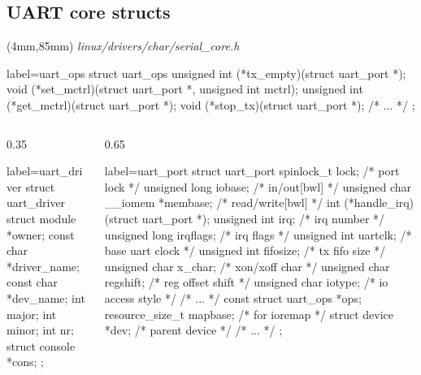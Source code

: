 \documentclass[xcolor=dvipsnames,compress]{beamer}
\newenvironment{reference}[2]{%
  \begin{textblock*}{\textwidth}(#1,#2) 
      \tiny\it\bgroup\color{blue}}{\egroup\end{textblock*}}
\begin{document}
\subsection*{UART core structs}
\begin{frame}[fragile]
\begin{reference}{4mm}{85mm}
linux/drivers/char/serial\_core.h
\end{reference} 
    \begin{ccode*}{label=uart\_ops} 
    struct uart_ops {
      unsigned int  (*tx_empty)(struct uart_port *);
      void          (*set_mctrl)(struct uart_port *, unsigned int mctrl);
      unsigned int  (*get_mctrl)(struct uart_port *);
      void          (*stop_tx)(struct uart_port *);
      /* ... */
    };   
    \end{ccode*}
    \begin{columns}[t]
    \begin{column}{0.35\textwidth}
    \begin{ccode*}{label=uart\_driver}
    struct uart_driver {
      struct module   *owner;
      const char      *driver_name;
      const char      *dev_name;
      int              major;
      int              minor;
      int              nr;
      struct console  *cons;
    };
    \end{ccode*}
    \end{column}
    \begin{column}{0.65\textwidth}
    \begin{ccode*}{label=uart\_port} 
    struct uart_port {
      spinlock_t             lock;      /* port lock */
      unsigned long          iobase;    /* in/out[bwl] */
      unsigned char __iomem  *membase;  /* read/write[bwl] */
      int                    (*handle_irq)(struct uart_port *);
      unsigned int           irq;       /* irq number */
      unsigned long          irqflags;  /* irq flags  */
      unsigned int           uartclk;   /* base uart clock */
      unsigned int           fifosize;  /* tx fifo size */
      unsigned char          x_char;    /* xon/xoff char */
      unsigned char          regshift;  /* reg offset shift */
      unsigned char          iotype;    /* io access style */
      /* ... */
      const struct uart_ops   *ops;
      resource_size_t        mapbase;   /* for ioremap */
      struct device          *dev;      /* parent device */
      /* ... */
    };
    \end{ccode*}
    \end{column}
    \end{columns}
\end{frame}
\end{document}
